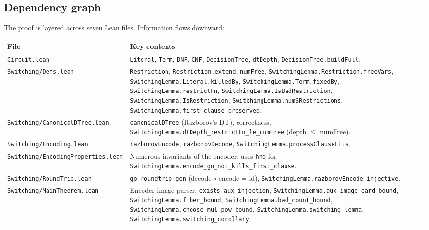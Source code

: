 \subsection{Dependency graph}

The proof is layered across seven Lean files.  Information flows downward:

\begin{center}
\begin{tabular}{l|l}
\textbf{File} & \textbf{Key contents} \\ \hline
\texttt{Circuit.lean}
  & \texttt{Literal}, \texttt{Term}, \texttt{DNF}, \texttt{CNF},
    \texttt{DecisionTree}, \texttt{dtDepth}, \texttt{DecisionTree.buildFull}.\\
\texttt{Switching/Defs.lean}
  & \texttt{Restriction}, \texttt{Restriction.extend}, \texttt{numFree},
    \texttt{SwitchingLemma.Restriction.freeVars}, \texttt{SwitchingLemma.Literal.killedBy}, \texttt{SwitchingLemma.Term.fixedBy},
    \texttt{SwitchingLemma.restrictFn}, \texttt{SwitchingLemma.IsBadRestriction}, \texttt{SwitchingLemma.IsRestriction},
    \texttt{SwitchingLemma.numSRestrictions}, \texttt{SwitchingLemma.first\_clause\_preserved}. \\
\texttt{Switching/CanonicalDTree.lean}
  & \texttt{canonicalDTree} (Razborov's DT), correctness,
    \texttt{SwitchingLemma.dtDepth\_restrictFn\_le\_numFree} (depth $\le$ numFree).\\
\texttt{Switching/Encoding.lean}
  & \texttt{razborovEncode}, \texttt{razborovDecode},
    \texttt{SwitchingLemma.processClauseLits}. \\
\texttt{Switching/EncodingProperties.lean}
  & Numerous invariants of the encoder; uses \texttt{hnd} for
    \texttt{SwitchingLemma.encode\_go\_not\_kills\_first\_clause}. \\
\texttt{Switching/RoundTrip.lean}
  & \texttt{go\_roundtrip\_gen} (decode $\circ$ encode = id),
    \texttt{SwitchingLemma.razborovEncode\_injective}. \\
\texttt{Switching/MainTheorem.lean}
  & Encoder image parser, \texttt{exists\_aux\_injection},
    \texttt{SwitchingLemma.aux\_image\_card\_bound}, \texttt{SwitchingLemma.fiber\_bound},
    \texttt{SwitchingLemma.bad\_count\_bound},
    \texttt{SwitchingLemma.choose\_mul\_pow\_bound}, \texttt{SwitchingLemma.switching\_lemma},
    \texttt{SwitchingLemma.switching\_corollary}. \\
\end{tabular}
\end{center}

